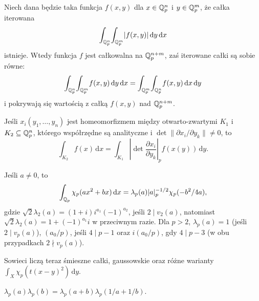 \begin{twierdzenie}[Fubini]
	Niech dana będzie taka funkcja $f(x, y)$ dla $x \in \mathbb Q_p^n$ i $y \in \mathbb Q_p^m$, że całka iterowana
	\[
		\int_{\mathbb Q_p^n} \!\int_{\mathbb Q_p^m} \!|f(x,y)| \,\textrm{d}y \,\textrm{d}x
	\]
	istnieje.
	Wtedy funkcja $f$ jest całkowalna na $\mathbb Q_p^{n+m}$, zaś iterowane całki są sobie równe:
	\[
		\int_{\mathbb Q_p^n} \!\int_{\mathbb Q_p^m} \!f(x,y) \,\textrm{d}y \,\textrm{d}x = \int_{\mathbb Q_p^m} \!\int_{\mathbb Q_p^n} \!f(x,y) \,\textrm{d}x \,\textrm{d}y
	\]
	i pokrywają się wartością z całką $f(x, y)$ nad $\mathbb Q_p^{n+m}$.
\end{twierdzenie}

\begin{fakt}
	Jeśli $x_i(y_1, \ldots, y_n)$ jest homeomorfizmem między otwarto-zwartymi $K_1$ i $K_2 \subseteq \mathbb Q_p^n$, którego współrzędne są analityczne i $\det \|\partial x_i / \partial y_k \| \neq 0$, to \[\int_{K_2} f(x) \,\textrm{d}x =  \int_{K_1} \left| \det \frac{\partial x_i}{\partial y_k} \right|_p f(x(y)) \,\textrm{d}y.\]
\end{fakt}

\begin{fakt}
	Jeśli  $a \neq 0$, to
	\[
		\int_{\mathbb Q_p} \chi_p(ax^2 + bx)\,\textrm{d} x = \lambda_p(a) |a|_p^{-1/2} \chi_p(-b^2 / 4a),
	\]
	gdzie $\sqrt 2 \lambda_2(a) = (1+i) i^{a_1} (-1)^{a_2}$, jeśli $2 \mid v_2(a)$, natomiast $\sqrt{2} \lambda_2(a) = 1 + (-1)^{a_1} i$ w przeciwnym razie.
	Dla $p > 2$, $\lambda_p(a) = 1$ (jeśli $2 \mid v_p(a)$), $(a_0/p)$, jeśli $4 \mid p - 1$ oraz $i (a_0/p)$, gdy $4 \mid p - 3$ (w obu przypadkach $2 \nmid v_p(a)$).
\end{fakt}

Sowieci liczą teraz śmieszne całki, gaussowskie oraz różne warianty $\int_X \chi_p (t(x-y)^2) \,\textrm{d}y$.

\begin{fakt}
	$\lambda_p(a) \lambda_p(b) = \lambda_p(a+b) \lambda_p(1/a+1/b)$. 
\end{fakt}